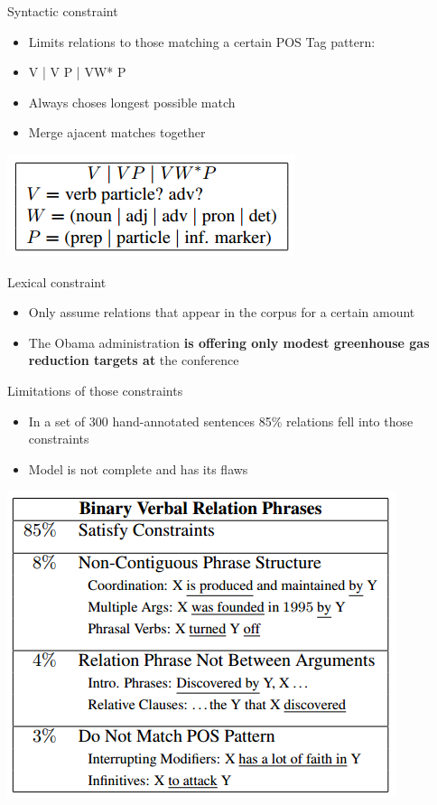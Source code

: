 \documentclass[11pt]{beamer}
\begin{document}
		
		\begin{frame}{Syntactic constraint}
			\begin{center}
				\begin{itemize}
				\item Limits relations to those matching a certain POS Tag pattern:
				\item V | V P | VW* P %
				\item Always choses longest possible match
				\item Merge ajacent matches together
				\end{itemize}
				\includegraphics[scale=0.5]{img/pos.png}\\
			\end{center}
		\end{frame}
		\begin{frame}{Lexical constraint}
			\begin{center}
				\begin{itemize}
				\item Only assume relations that appear in the corpus for a certain amount
				\item The Obama administration \textbf{is offering only modest greenhouse gas reduction targets at} the conference
				\end{itemize}
			\end{center}
		\end{frame}
		\begin{frame}{Limitations of those constraints}
			\begin{center}
				\begin{itemize}
				\item In a set of 300 hand-annotated sentences 85\% relations fell into those constraints
				\item Model is not complete and has its flaws
				\end{itemize}
				\includegraphics[scale=0.5]{img/constraints.png}\\	
			\end{center}
		\end{frame}
\end{document}
